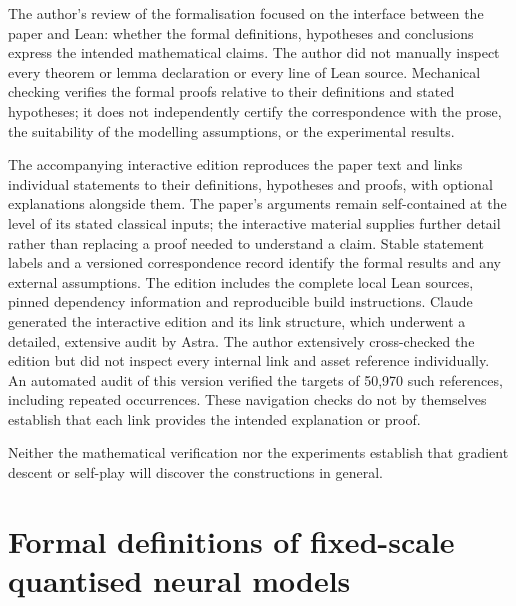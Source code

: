 \documentclass[twoside,11pt]{article}
\numberwithin{theorem}{section}
\numberwithin{equation}{section}
\begin{document}
The author's review of the formalisation focused on the interface between the paper and Lean: whether the formal definitions, hypotheses and conclusions express the intended mathematical claims. The author did not manually inspect every theorem or lemma declaration or every line of Lean source. Mechanical checking verifies the formal proofs relative to their definitions and stated hypotheses; it does not independently certify the correspondence with the prose, the suitability of the modelling assumptions, or the experimental results.

The accompanying interactive edition \citep{riis2026interactive} reproduces the paper text and links individual statements to their definitions, hypotheses and proofs, with optional explanations alongside them. The paper's arguments remain self-contained at the level of its stated classical inputs; the interactive material supplies further detail rather than replacing a proof needed to understand a claim. Stable statement labels and a versioned correspondence record identify the formal results and any external assumptions. The edition includes the complete local Lean sources, pinned dependency information and reproducible build instructions. Claude generated the interactive edition and its link structure, which underwent a detailed, extensive audit by Astra. The author extensively cross-checked the edition but did not inspect every internal link and asset reference individually. An automated audit of this version verified the targets of 50,970 such references, including repeated occurrences. These navigation checks do not by themselves establish that each link provides the intended explanation or proof.

Neither the mathematical verification nor the experiments establish that gradient descent or self-play will discover the constructions in general.




\noindent\begin{minipage}{\linewidth}
\end{minipage}

\appendix

\section{Formal definitions of fixed-scale quantised neural models}
\label{app:defs}
\end{document}
